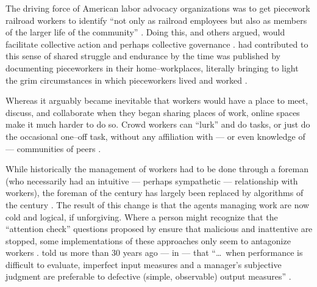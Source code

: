 \documentclass[trackingWork]{subfiles}
\begin{document}
The driving force of American labor advocacy organizations was to get piecework railroad workers
to identify
``not only as railroad employees but also as members of the larger life of the community''
\cite{american1921problem}.
Doing this, 
\citeauthor{ostrom1990governing} and others argued,
would facilitate collective action and perhaps collective governance
\cite{ostrom1990governing,russell1982collective,olsonlogic}.
\citeauthor{riisOtherSideLives} had contributed to this sense of shared struggle and endurance
by the time  was published
by documenting pieceworkers in their home--workplaces,
literally bringing to light the grim circumstances in which pieceworkers lived and worked
\cite{riisOtherSideLives}.




\subsubsubsection{\whatchanged}
Whereas it arguably became inevitable that workers would have a place to
meet, discuss, and collaborate
when they began sharing places of work,
online spaces make it much harder to do so.
Crowd workers can ``lurk'' and do tasks, or just do the occasional one--off task,
without any affiliation with
--- or even knowledge of ---
communities of peers
\cite{miller2011understanding,mcinnis2016one,earl2011digitally}.

While historically the management of workers had to be done through a foreman
(who necessarily had an intuitive
--- perhaps sympathetic ---
relationship with workers),
the foreman of the  century has largely been replaced
by algorithms of the  century
\cite{uberAlgorithm}.
The result of this change is that the agents managing work are now
cold and logical, if unforgiving.
Where a person might recognize that the ``attention check'' questions 
proposed by \citeauthor{le2010ensuring} ensure that malicious and inattentive are stopped,
some implementations of these approaches
only seem to antagonize workers 
\cite{le2010ensuring,MaliciousCrowdworkersGadiraju}.
\citeauthor{10.2307/2555446} told us more than 30 years ago
--- in \citeyear{10.2307/2555446} --- that
``\dots~when performance is difficult to evaluate,
imperfect input measures and
a manager's subjective judgment are preferable to
defective (simple, observable) output measures''
\cite{10.2307/2555446}.
\end{document}
